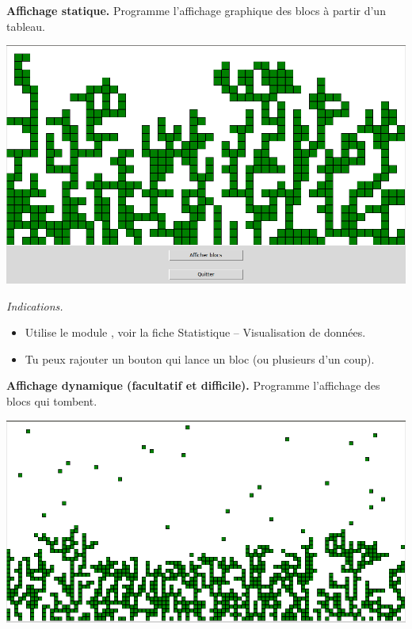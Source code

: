 \documentclass[11pt,class=report,crop=false]{standalone}
\begin{document}
\begin{activite}


\textbf{Affichage statique.} Programme l'affichage graphique des blocs à partir d'un tableau.

\begin{center}
\includegraphics[scale=0.3]{ecran-alea-bloc1}
\end{center}
\medskip

\emph{Indications.}
\begin{itemize}
  \item Utilise le module , voir la fiche \og{}Statistique -- Visualisation de données\fg{}.
  \item Tu peux rajouter un bouton qui lance un bloc (ou plusieurs d'un coup). 
\end{itemize}

\medskip



\textbf{Affichage dynamique (facultatif et difficile).} Programme l'affichage des blocs qui tombent.
\medskip

\begin{center}
\includegraphics[scale=0.3]{ecran-alea-bloc2}
\end{center}


\end{activite}
\end{document}
